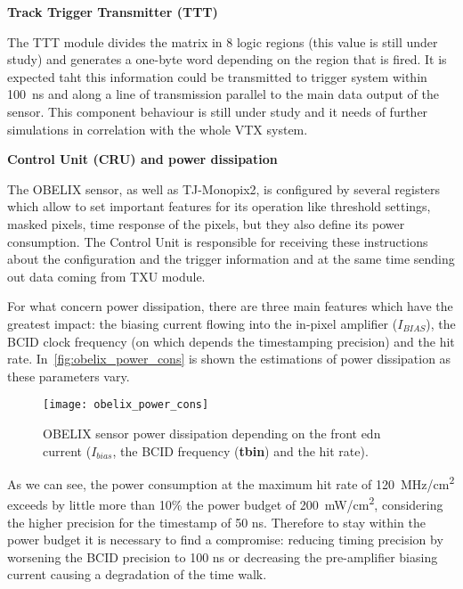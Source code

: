 \begin{description}
\item \textbf{Track Trigger Transmitter (TTT)}
\end{description}

The TTT module divides the matrix in 8 logic regions (this value is still under study) and generates a one-byte word depending on the region that is fired. It is expected taht this information could be transmitted to trigger system within \SI{100}{ns} and along a line of transmission parallel to the main data output of the sensor. 
This component behaviour is still under study and it needs of further simulations in correlation with the whole VTX system.


\begin{description}
\item \textbf{Control Unit (CRU) and power dissipation}
\end{description}

The OBELIX sensor, as well as TJ-Monopix2, is configured by several registers which allow to set important features for its operation like threshold settings, masked pixels, time response of the pixels, but they also define its power consumption. The Control Unit is responsible for receiving these instructions about the configuration and the trigger information and at the same time sending out data coming from TXU module.

For what concern power dissipation, there are three main features which have the greatest impact: the biasing current flowing into the in-pixel amplifier (\textit{$I_{BIAS}$}), the BCID clock frequency (on which depends the timestamping precision) and the hit rate. In~\autoref{fig:obelix_power_cons} is shown the estimations of power dissipation as these parameters vary.

\begin{figure}[h!]
\centering
\texttt{[image: obelix\_power\_cons]}
\caption{OBELIX sensor power dissipation depending on the front edn current (\textbf{$I_{bias}$}, the BCID frequency (\textbf{tbin}) and the hit rate).}
\label{fig:obelix_power_cons}
\end{figure}

As we can see, the power consumption at the maximum hit rate of \SI{120}{MHz/cm^{2}} exceeds by little more than 10\% the power budget of \SI{200}{mW/cm^{2}}, considering the higher precision for the timestamp of 50 ns. Therefore to stay within the power budget it is necessary to find a compromise: reducing timing precision by worsening the BCID precision to 100 ns or decreasing the pre-amplifier biasing current causing a degradation of the time walk.



